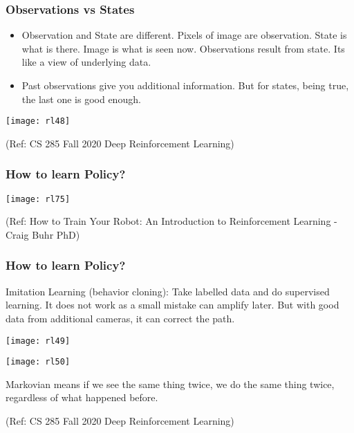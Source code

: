 \begin{frame}[fragile]\frametitle{Observations vs States}

\begin{itemize}
\item Observation and State are different. Pixels of image are observation. State is what is there. Image is what is seen now. Observations result from state. Its like a view of underlying data.
\item Past observations give you additional information. But for states, being true, the last one is good enough.
\end{itemize}


\begin{center}
\texttt{[image: rl48]}
\end{center}


{\tiny (Ref: CS 285 Fall 2020 Deep Reinforcement Learning)}

\end{frame}

\begin{frame}[fragile]\frametitle{How to learn Policy?}


\begin{center}
\texttt{[image: rl75]}
\end{center}

{\tiny (Ref: How to Train Your Robot: An Introduction to Reinforcement Learning - Craig Buhr PhD)}

\end{frame}


\begin{frame}[fragile]\frametitle{How to learn Policy?}

Imitation Learning (behavior cloning): Take labelled data and do supervised learning. It does not work as a small mistake can amplify later. But with good data from additional cameras, it can correct the path.


\begin{center}
\texttt{[image: rl49]}

\texttt{[image: rl50]}

\end{center}

Markovian means if we see the same thing twice, we do the same thing twice, regardless of what happened before.


{\tiny (Ref: CS 285 Fall 2020 Deep Reinforcement Learning)}

\end{frame}


